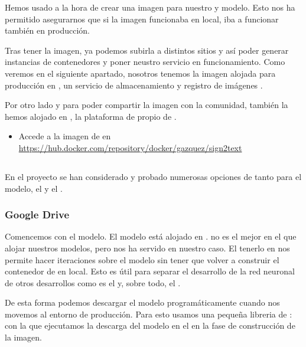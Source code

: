 Hemos usado  a la hora de crear una imagen para nuestro  y modelo. Esto nos ha permitido asegurarnos que si la imagen funcionaba en local, iba a funcionar también en producción.

Tras tener la imagen, ya podemos subirla a distintos sitios y así poder generar instancias de contenedores y poner neustro servicio en funcionamiento. Como veremos en el siguiente apartado, nosotros tenemos la imagen alojada para producción en , un servicio de almacenamiento y registro de imágenes .

Por otro lado y para poder compartir la imagen con la comunidad, también la hemos alojado en , la plataforma de  propio de .

\begin{itemize}
  \item Accede a la imagen de  en \url{https://hub.docker.com/repository/docker/gazquez/sign2text}
\end{itemize}

\subsection{}

En el proyecto se han considerado y probado numerosas opciones de  tanto para el modelo, el  y el .

\subsubsection{Google Drive}

Comencemos con el modelo. El modelo está alojado en .  no es el mejor  en el que alojar nuestros modelos, pero nos ha servido en nuestro caso. El tenerlo en  nos permite hacer iteraciones sobre el modelo sin tener que volver a construir el contenedor de  en local. Esto es útil para separar el desarrollo de la red neuronal de otros desarrollos como es el  y, sobre todo, el .

De esta forma podemos descargar el modelo programáticamente cuando nos movemos al entorno de producción. Para esto usamos una pequeña libreria de :  con la que ejecutamos la descarga del modelo en el  en la fase de construcción de la imagen.

